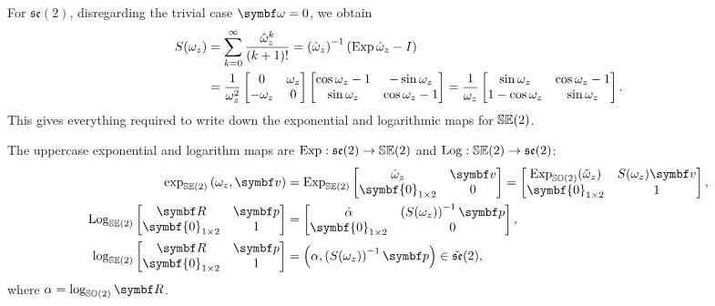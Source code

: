 For $\mathfrak{se}(2)$, disregarding the trivial case $\bomega = 0$, we obtain
\begin{equation}
  \begin{aligned}
    S(\omega_z)
     & = \sum_{k = 0}^\infty \frac{\hat \omega_z^k}{(k+1)!} = \left( \hat \omega_z \right)^{-1} \left( \operatorname{Exp} \hat \omega_z - I \right) \\
     & = \frac{1}{\omega_z^2} \begin{bmatrix}
      0 & \omega_z \\ -\omega_z & 0
    \end{bmatrix} \begin{bmatrix}
      \cos \omega_z - 1 & -\sin \omega_z \\ \sin \omega_z & \cos \omega_z - 1
    \end{bmatrix} =  \frac{1}{\omega_z}\begin{bmatrix}
      \sin \omega_z     & \cos \omega_z - 1 \\
      1 - \cos \omega_z & \sin \omega_z
    \end{bmatrix}.
  \end{aligned}
\end{equation}
This gives everything required to write down the exponential and logarithmic maps for ${\mathbb{SE}(2)}$.
\begin{important}
  The uppercase exponential and logarithm maps are $\operatorname{Exp} : \mathfrak{se}(2) \rightarrow {\mathbb{SE}(2)}$ and $\operatorname{Log} : {\mathbb{SE}(2)} \rightarrow \mathfrak{se}(2)$:
  \begin{subequations}
    \begin{align}
      \exp_\SEtwo \left( \omega_z, \bv \right) & = \Exp_{\SEtwo} \begin{bmatrix}
        \hat \omega_z & \bv \\ \symbf{0}_{1 \times 2} & 0
      \end{bmatrix} =  \begin{bmatrix}
        \Exp_{\SOtwo} (\hat \omega_z) & S(\omega_z)\bv \\ \symbf{0}_{1 \times 2} & 1
      \end{bmatrix},                  \\
      \Log_{\SEtwo} \begin{bmatrix} \bR & \bp \\ \symbf{0}_{1 \times 2} & 1 \end{bmatrix} & = \begin{bmatrix}
        \hat \alpha & \left( S(\omega_z) \right)^{-1} \bp \\ \symbf{0}_{1 \times 2} & 0
      \end{bmatrix},                                                              \\
      \log_\SEtwo \begin{bmatrix} \bR & \bp \\ \symbf{0}_{1 \times 2} & 1 \end{bmatrix}   & = \left( \alpha,  \left( S(\omega_z) \right)^{-1} \bp\right) \in \check{\mathfrak{se}}(2),
    \end{align}
  \end{subequations}
  where $\alpha = \log_\SOtwo \bR$.
\end{important}

